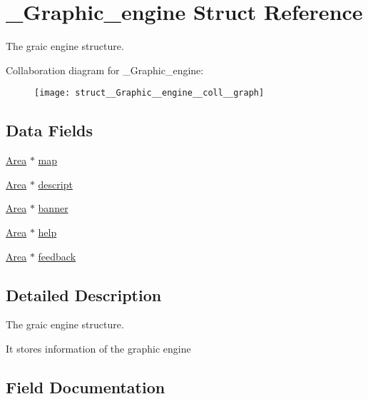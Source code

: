 \hypertarget{struct__Graphic__engine}{}\section{\+\_\+\+Graphic\+\_\+engine Struct Reference}
\label{struct__Graphic__engine}


The graic engine structure.  




Collaboration diagram for \+\_\+\+Graphic\+\_\+engine\+:\nopagebreak
\begin{figure}[H]
\begin{center}
\leavevmode
\texttt{[image: struct\_\_Graphic\_\_engine\_\_coll\_\_graph]}
\end{center}
\end{figure}
\subsection*{Data Fields}
\begin{DoxyCompactItemize}
\item 
\hyperlink{screen_8h_acfdfc42f6522d75fa3c16713afde8127}{Area} $\ast$ \hyperlink{struct__Graphic__engine_a1ea06bb881d335da8c31d63b3e834bdb}{map}
\item 
\hyperlink{screen_8h_acfdfc42f6522d75fa3c16713afde8127}{Area} $\ast$ \hyperlink{struct__Graphic__engine_a414bb888ecce3389c7ce348264758e58}{descript}
\item 
\hyperlink{screen_8h_acfdfc42f6522d75fa3c16713afde8127}{Area} $\ast$ \hyperlink{struct__Graphic__engine_a440dfb2c23c3c4b7d3871187371117b9}{banner}
\item 
\hyperlink{screen_8h_acfdfc42f6522d75fa3c16713afde8127}{Area} $\ast$ \hyperlink{struct__Graphic__engine_ade1d3e95ad6def427f613a4a2d101875}{help}
\item 
\hyperlink{screen_8h_acfdfc42f6522d75fa3c16713afde8127}{Area} $\ast$ \hyperlink{struct__Graphic__engine_a4fc0ef353d000b20d57fb75d898c6d2d}{feedback}
\end{DoxyCompactItemize}


\subsection{Detailed Description}
The graic engine structure. 

It stores information of the graphic engine 

\subsection{Field Documentation}
\mbox{\label{struct__Graphic__engine_a440dfb2c23c3c4b7d3871187371117b9}} 
